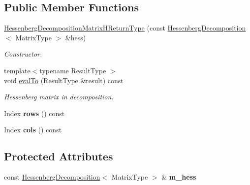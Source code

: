 \subsection*{Public Member Functions}
\begin{DoxyCompactItemize}
\item 
\mbox{\hyperlink{struct_eigen_1_1internal_1_1_hessenberg_decomposition_matrix_h_return_type_aa6d46d84c1343c964c50457ca4ddf9fa}{Hessenberg\+Decomposition\+Matrix\+H\+Return\+Type}} (const \mbox{\hyperlink{class_eigen_1_1_hessenberg_decomposition}{Hessenberg\+Decomposition}}$<$ Matrix\+Type $>$ \&hess)
\begin{DoxyCompactList}\small\item\em Constructor. \end{DoxyCompactList}\item 
{\footnotesize template$<$typename Result\+Type $>$ }\\void \mbox{\hyperlink{struct_eigen_1_1internal_1_1_hessenberg_decomposition_matrix_h_return_type_a7f1d84113072d2d2e507d3821ff9f15c}{eval\+To}} (Result\+Type \&result) const
\begin{DoxyCompactList}\small\item\em Hessenberg matrix in decomposition. \end{DoxyCompactList}\item 
\mbox{\label{struct_eigen_1_1internal_1_1_hessenberg_decomposition_matrix_h_return_type_ad0a6e19c33a4feb42b7ced19ea9aa28b}} 
Index {\bfseries rows} () const
\item 
\mbox{\label{struct_eigen_1_1internal_1_1_hessenberg_decomposition_matrix_h_return_type_a1a5dc498ba22dd3c627701548b2da6a1}} 
Index {\bfseries cols} () const
\end{DoxyCompactItemize}
\subsection*{Protected Attributes}
\begin{DoxyCompactItemize}
\item 
\mbox{\label{struct_eigen_1_1internal_1_1_hessenberg_decomposition_matrix_h_return_type_accffcc918345d174926e679a82e371e7}} 
const \mbox{\hyperlink{class_eigen_1_1_hessenberg_decomposition}{Hessenberg\+Decomposition}}$<$ Matrix\+Type $>$ \& {\bfseries m\+\_\+hess}
\end{DoxyCompactItemize}
